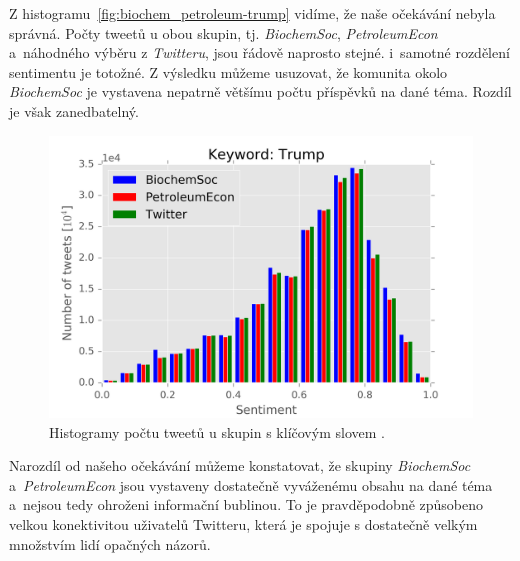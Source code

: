 \documentclass[12pt, a4paper]{article}
\numberwithin{equation}{section} 	%
\begin{document}
Z histogramu~\autoref{fig:biochem_petroleum-trump} vidíme, že naše očekávání nebyla správná. Počty tweetů u obou skupin, tj. \textit{BiochemSoc}, \textit{PetroleumEcon} a~náhodného výběru z \textit{Twitteru}, jsou řádově naprosto stejné. i~samotné rozdělení sentimentu je totožné. Z výsledku můžeme usuzovat, že komunita okolo \textit{BiochemSoc} je vystavena nepatrně většímu počtu příspěvků na dané téma. Rozdíl je však zanedbatelný.
\begin{figure}[h]
\centering
\includegraphics[scale=0.5]{./Pics/biochem_petroleum-trump.png}
\caption{Histogramy počtu tweetů u skupin s klíčovým slovem \textit{}.}
\label{fig:biochem_petroleum-trump}
\end{figure}

Narozdíl od našeho očekávání můžeme konstatovat, že skupiny \textit{BiochemSoc} a~\textit{PetroleumEcon} jsou vystaveny dostatečně vyváženému obsahu na dané téma a~nejsou tedy ohroženi informační bublinou. To je pravděpodobně způsobeno velkou konektivitou uživatelů Twitteru, která je spojuje s dostatečně velkým množstvím lidí opačných názorů.
\end{document}
